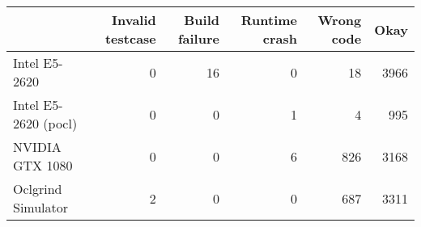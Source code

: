 \begin{tabular}{lrrrrr}
\toprule
{} &  Invalid testcase &  Build failure &  Runtime crash &  Wrong code &  Okay \\
\midrule
Intel E5-2620        &                 0 &             16 &              0 &          18 &  3966 \\
Intel E5-2620 (pocl) &                 0 &              0 &              1 &           4 &   995 \\
NVIDIA GTX 1080      &                 0 &              0 &              6 &         826 &  3168 \\
Oclgrind Simulator   &                 2 &              0 &              0 &         687 &  3311 \\
\bottomrule
\end{tabular}
